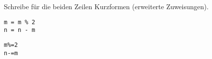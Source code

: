 \question[2]
Schreibe für die beiden Zeilen Kurzformen (erweiterte Zuweisungen).
\begin{lstlisting}
m = m % 2
n = n - m
\end{lstlisting}
\begin{solutionbox}{2cm}
\begin{lstlisting}
m%=2
n-=m
\end{lstlisting}
\end{solutionbox}
